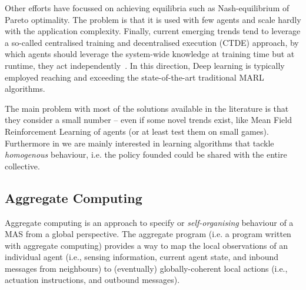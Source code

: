 \documentclass[11pt]{article}
\begin{document}
Other efforts have focussed on achieving equilibria such as Nash-equilibrium of Pareto optimality.
The problem is that it is used with few agents and scale hardly with the application complexity.
%
Finally, current emerging trends tend to leverage a so-called centralised training and decentralised execution (CTDE) approach, by which 
 agents should leverage the system-wide knowledge at training time but at runtime, they act independently~\cite{DBLP:journals/aamas/Hernandez-LealK19}. In this direction, Deep learning is typically employed reaching and exceeding the state-of-the-art traditional MARL algorithms.
 
The main problem with most of the solutions available in the literature is that they consider a  small number -- even if some novel trends exist, like Mean Field Reinforcement Learning of agents (or at least test them on small games).
Furthermore in \cpsw{} we are mainly interested in learning algorithms that tackle \emph{homogenous} behaviour, i.e. the policy founded could be shared with the entire collective.
\subsection{Aggregate Computing}

Aggregate computing is an approach to specify or \emph{self-organising} behaviour of a MAS from a global perspective.
%
The aggregate program (i.e. a program written with aggregate computing) provides a way to map the local observations of an individual agent (i.e., sensing information, current agent state, and inbound messages from neighbours) to (eventually) globally-coherent local actions
 (i.e., actuation instructions, and outbound messages).
%
\end{document}
